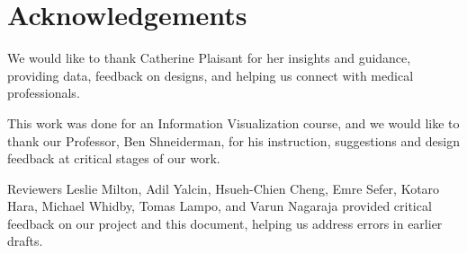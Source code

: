 \documentclass{chi2009}
\begin{document}
\section{Acknowledgements}
We would like to thank Catherine Plaisant for her insights and guidance, providing data, feedback on designs, and helping us connect with medical professionals.

This work was done for an Information Visualization course, and we would like to thank our Professor, Ben Shneiderman, for his instruction, suggestions and design feedback at critical stages of our work.

Reviewers Leslie Milton, Adil Yalcin, Hsueh-Chien Cheng, Emre Sefer, Kotaro Hara, Michael Whidby, Tomas Lampo, and Varun Nagaraja provided critical feedback on our project and this document, helping us address errors in earlier drafts.




\end{document}
